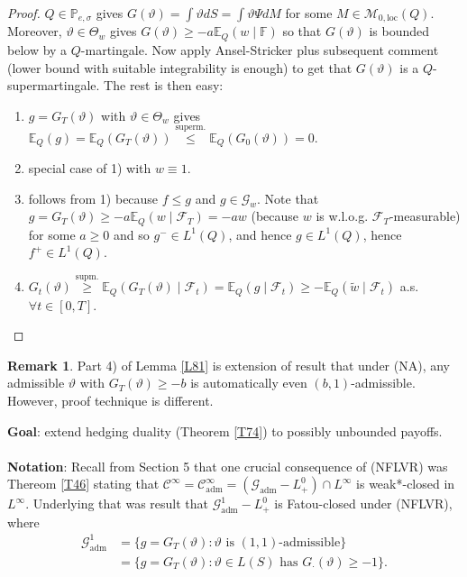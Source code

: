 \documentclass[12pt,a4paper, twoside]{article}
\theoremstyle{definition}
\newtheorem{rem}{Remark}[section]
\newcommand{\EE}{\mathbb{E}} %
\newcommand{\PP}{\mathbb{P}} %
\begin{document}
\begin{proof}
$Q \in \PP_{e,  \sigma}$ gives $G( \vartheta) = \int \vartheta dS = \int  \vartheta \Psi dM$ for some $M \in \mathcal{M}_{0, \text{loc}}(Q)$. Moreover, $\vartheta \in \Theta_w$ gives $G( \vartheta) \geq -a \EE_Q(w \mid \mathbb{F})$ so that $G( \vartheta)$ is bounded below by a $Q$-martingale. Now apply Ansel-Stricker plus subsequent comment (lower bound with suitable integrability is enough) to get that $G( \vartheta)$ is a $Q$-supermartingale. The rest is then easy: 
\begin{enumerate}
\item $g= G_T( \vartheta)$ with $\vartheta \in \Theta_w$ gives $\EE_Q(g) = \EE_Q(G_T( \vartheta)) \overset{\text{superm.}}\leq \EE_Q( G_0( \vartheta))=0.$
\item special case of 1) with $w \equiv 1$. 
\item follows from 1) because $f \leq g$ and $g \in \mathcal{G}_w$. Note that $g = G_T( \vartheta) \geq -a \EE_Q(w \mid \mathcal{F}_T)= -aw$ (because $w$ is w.l.o.g. $\mathcal{F}_T$-measurable) for some $a \geq 0$ and so $g^- \in L^1(Q)$, and hence $g \in L^1(Q)$, hence $f^+ \in L^1(Q)$. 
\item  $G_t( \vartheta) \overset{\text{supm.}}\geq  \EE_Q(G_T( \vartheta) \mid \mathcal{F}_t) = \EE_Q(g \mid \mathcal{F}_t) \geq - \EE_Q( \widetilde{w} \mid \mathcal{F}_t)$ a.s. $\forall t \in [0,T]$. 
\end{enumerate} 
\end{proof}
\newpage
\begin{rem} Part 4) of Lemma \ref{L81} is extension of result that under (NA), any admissible $\vartheta$ with $G_T( \vartheta)  \geq -b$ is automatically even $(b,1)$-admissible. However, proof technique is different. 
\end{rem}
\noindent \textbf{Goal}: extend hedging duality (Theorem \ref{T74}) to possibly unbounded payoffs. 
\\\\
\textbf{Notation}: Recall from Section 5 that one crucial consequence of (NFLVR) was Thereom \ref{T46} stating that $\mathcal{C}^\infty = \mathcal{C}_\text{adm}^\infty = ( \mathcal{G}_\text{adm}- L_+^0) \cap L^\infty$ is weak*-closed in $L^\infty$. Underlying that was result that $\mathcal{G}_\text{adm}^1 - L_+^0$ is Fatou-closed under (NFLVR), where 
\begin{align*}
\mathcal{G}_\text{adm}^1&= \{ g = G_T( \vartheta): \vartheta \text{ is $(1,1)$-admissible}\} \\
&= \{ g = G_T( \vartheta): \vartheta \in L(S) \text{ has } G_\cdot( \vartheta) \geq -1 \}. 
\end{align*}
\end{document}
